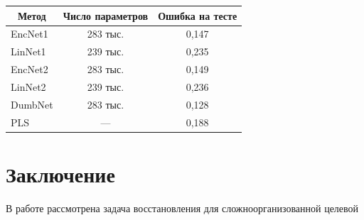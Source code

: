 \begin{table}\small %

\begin{center}

\parbox{234pt}{

}



\label{tbl:2}

\vspace*{2ex}





\tabcolsep=7.3pt

\begin{tabular}{|l|c|c|}

\hline

\multicolumn{1}{|c|}{Метод} &     Число параметров &     Ошибка на тесте\\

\hline

    EncNet1 &  283  тыс.& 0,147\\

        LinNet1 & 239  тыс.& 0,235\\

        EncNet2 & 283  тыс.& 0,149\\

        LinNet2 &  239  тыс.& 0,236\\

        DumbNet &  283  тыс.& 0,128\\

        PLS& --- & 0,188\\  

   \hline

\end{tabular}

\end{center}

\end{table}



\section{Заключение}



В работе рассмотрена задача восстановления для сложноорганизованной целевой 

